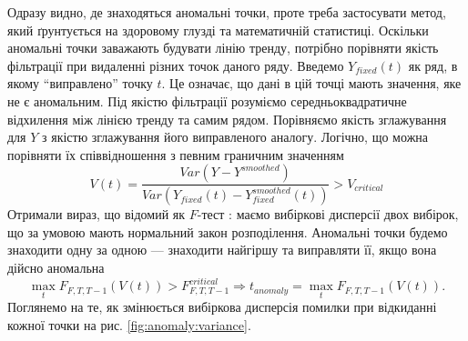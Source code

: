 
Одразу видно, де знаходяться аномальні точки,
проте треба застосувати метод,
який ґрунтується на здоровому глузді
та математичній статистиці.
Оскільки аномальні точки заважають будувати лінію тренду,
потрібно порівняти якість фільтрації при видаленні різних точок даного ряду.
Введемо $Y_{fixed}\left( t \right)$ як ряд, в якому ``виправлено'' точку $t$.
Це означає, що дані в цій точці мають значення, яке не є аномальним.
Під якістю фільтрації розуміємо середньоквадратичне відхилення
між лінією тренду та самим рядом.
Порівняємо якість зглажування для $Y$
з якістю зглажування його виправленого аналогу.
Логічно, що можна порівняти їх співвідношення з певним граничним значенням
\begin{equation*}
  V\left( t \right)
  = \frac{Var\left( Y - Y^{smoothed} \right)}
         {Var\left( Y_{fixed}\left(t\right)
                    - Y_{fixed}^{smoothed}\left(t\right) \right)}
  > V_{critical}
\end{equation*}
Отримали вираз, що відомий як $F$-тест \cite{lomax2007statistical}:
маємо вибіркові дисперсії двох вибірок,
що за умовою мають нормальний закон розподілення.
Аномальні точки будемо знаходити одну за одною ---
знаходити найгіршу та виправляти її,
якщо вона дійсно аномальна
\begin{equation*}
  \max\limits_{t}{F_{F, T, T-1}\left( V\left( t \right) \right)}
    > F_{F, T, T-1}^{critical}
  \Longrightarrow
  t_{anomaly} = \max\limits_{t}{F_{F, T, T-1}\left( V\left( t \right) \right)}.
\end{equation*}
Поглянемо на те, як змінюється вибіркова дисперсія помилки
при відкиданні кожної точки на рис. \ref{fig:anomaly:variance}.
